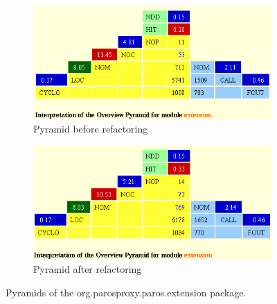 \begin{figure}[h]
	\begin{subfigure}{0.5\textwidth}
		\centering
		\includegraphics[width=0.9\linewidth]{../Diagrams/pyramidExtensionPreRef}
		\caption{Pyramid before refactoring}
	\end{subfigure}%
	\begin{subfigure}{0.5\textwidth}
		\centering
		\includegraphics[width=0.9\linewidth]{../Diagrams/pyramidExtensionProstRef}
		\caption{Pyramid after refactoring}
	\end{subfigure}
	\caption{Pyramids of the org.parosproxy.paros.extension package.}
\end{figure}



